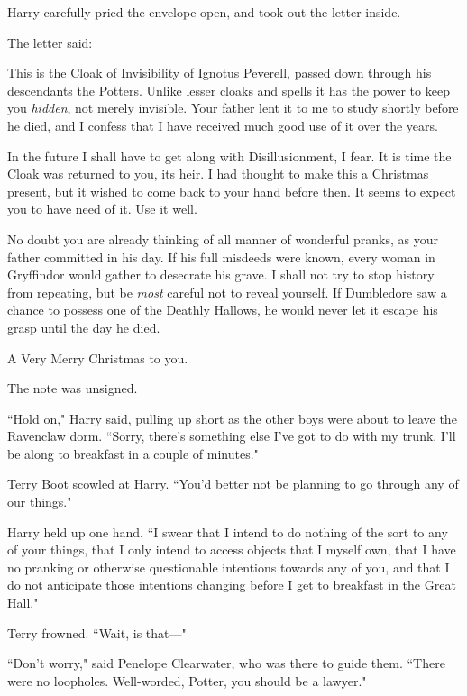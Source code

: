 Harry carefully pried the envelope open, and took out the letter inside.

The letter said:

\begin{writtenNote}
This is the Cloak of Invisibility of Ignotus Peverell, passed down through his descendants the Potters. Unlike lesser cloaks and spells it has the power to keep you \emph{hidden}, not merely invisible. Your father lent it to me to study shortly before he died, and I confess that I have received much good use of it over the years.

In the future I shall have to get along with Disillusionment, I fear. It is time the Cloak was returned to you, its heir. I had thought to make this a Christmas present, but it wished to come back to your hand before then. It seems to expect you to have need of it. Use it well.

No doubt you are already thinking of all manner of wonderful pranks, as your father committed in his day. If his full misdeeds were known, every woman in Gryffindor would gather to desecrate his grave. I shall not try to stop history from repeating, but be \emph{most} careful not to reveal yourself. If Dumbledore saw a chance to possess one of the Deathly Hallows, he would never let it escape his grasp until the day he died.

A Very Merry Christmas to you.
\end{writtenNote}

The note was unsigned.

\later

``Hold on," Harry said, pulling up short as the other boys were about to leave the Ravenclaw dorm. ``Sorry, there's something else I've got to do with my trunk. I'll be along to breakfast in a couple of minutes."

Terry Boot scowled at Harry. ``You'd better not be planning to go through any of our things."

Harry held up one hand. ``I swear that I intend to do nothing of the sort to any of your things, that I only intend to access objects that I myself own, that I have no pranking or otherwise questionable intentions towards any of you, and that I do not anticipate those intentions changing before I get to breakfast in the Great Hall."

Terry frowned. ``Wait, is that—"

``Don't worry," said Penelope Clearwater, who was there to guide them. ``There were no loopholes. Well-worded, Potter, you should be a lawyer."

